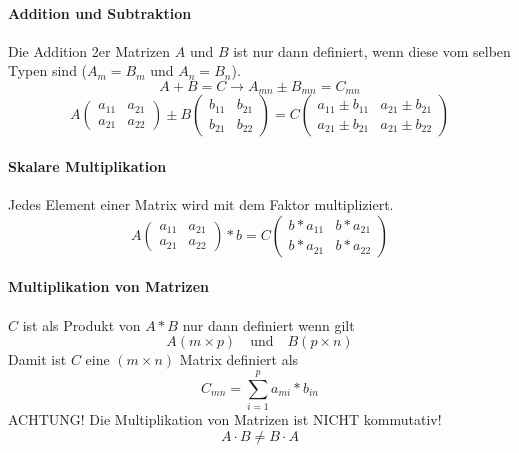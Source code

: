 \documentclass{school}
\begin{document}
\paragraph{Addition und Subtraktion}
Die Addition 2er Matrizen $A$ und $B$ ist nur dann definiert, wenn diese vom selben Typen sind ($A_m = B_m$ und $A_n = B_n$).
$$A + B = C \to A_{mn} \pm B_{mn} = C_{mn}$$
$$
A \begin{pmatrix}
a_{11} & a_{21}\\
a_{21} & a_{22}
\end{pmatrix} \pm
B \begin{pmatrix}
b_{11} & b_{21}\\
b_{21} & b_{22}
\end{pmatrix} =
C \begin{pmatrix}
a_{11} \pm b_{11} & a_{21} \pm b_{21}\\
a_{21} \pm b_{21} & a_{21} \pm b_{22}
\end{pmatrix}
$$

\paragraph{Skalare Multiplikation}
Jedes Element einer Matrix wird mit dem Faktor multipliziert.
$$
A \begin{pmatrix}
a_{11} & a_{21}\\
a_{21} & a_{22}
\end{pmatrix} * b =
C \begin{pmatrix}
b * a_{11} & b * a_{21}\\
b * a_{21} & b * a_{22}
\end{pmatrix}
$$

\newpage
\paragraph{Multiplikation von Matrizen}
$C$ ist als Produkt von $A * B$ nur dann definiert wenn gilt
$$A(m \times p) \quad \text{und} \quad B(p \times n)$$
Damit ist $C$ eine $(m \times n)$ Matrix definiert als
$$C_{mn} = \sum_{i = 1}^{p} a_{mi} * b_{in}$$
ACHTUNG! Die Multiplikation von Matrizen ist NICHT kommutativ!
$$A \cdot B \ne B \cdot A$$
\end{document}
